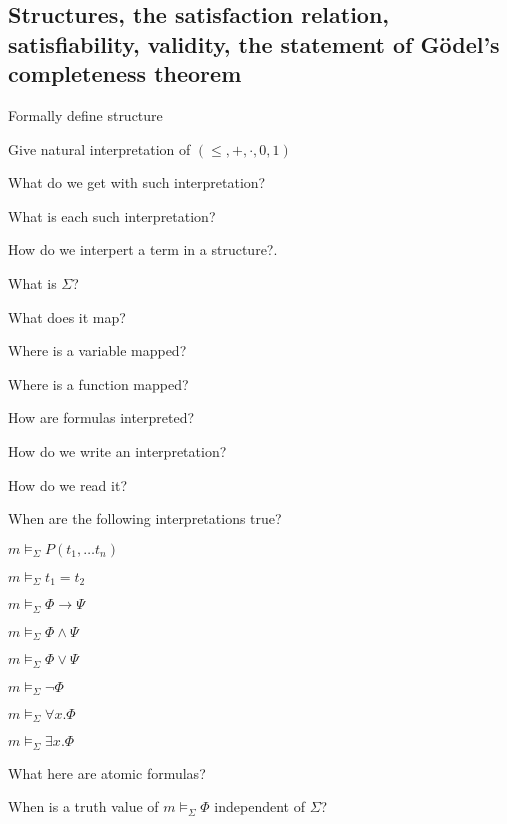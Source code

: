 \documentclass[fleqn]{article}
\begin{document}
\subsection{Structures, the satisfaction relation, satisfiability, validity, the statement of Gödel's completeness theorem}
\begin{enumerate}
    {\color{red}\item Formally define structure}
    {\color{red}\item Give natural interpretation of $(\leq, +, \cdot, 0, 1)$}
    \item What do we get with such interpretation?
    {\color{red}\item What is each such interpretation?}
    {\color{red}\item How do we interpert a term in a structure?.}
    \item What is $\Sigma$?
    {\color{red}\item What does it map?}
    {\color{red}\item Where is a variable mapped?}
    {\color{red}\item Where is a function mapped?}
    {\color{red}\item How are formulas interpreted?}
    {\color{red}\item How do we write an interpretation?}
    {\color{red}\item How do we read it?}
    \item When are the following interpretations true?
    \begin{itemize}
        \item $m \models_{\Sigma} P (t_1, \dots t_n)$
        \item $m \models_{\Sigma} t_1 = t_2$
        {\color{red}\item $m \models_{\Sigma} \Phi \rightarrow \Psi$}
        \item $m \models_{\Sigma} \Phi \wedge \Psi$
        \item $m \models_{\Sigma} \Phi \vee \Psi$
        \item $m \models_{\Sigma} \neg \Phi$
        {\color{red}\item $m \models_{\Sigma} \forall x. \Phi$}
        {\color{red}\item $m \models_{\Sigma} \exists x. \Phi$}
    \end{itemize}
    \item What here are atomic formulas?
    \item When is a truth value of $m \models_{\Sigma} \Phi$ independent of $\Sigma$?

\end{enumerate}
\end{document}
